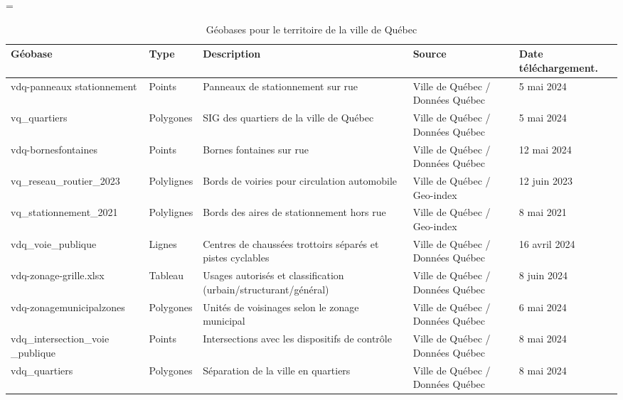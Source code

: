       \begin{landscape}
        \LTcapwidth=\textwidth
      \begin{longtable}[h!]{p{.2 \linewidth} p{.1 \linewidth} p{.3 \linewidth} p{.15\linewidth} p{.125\linewidth} }
        
        
        \hline
        Géobase & Type & Description  & Source & Date téléchargement.\\ 
        \hline
        \hline
        \endhead
        \hline
        \endfoot
        \hline
        \caption{Géobases pour le territoire de la ville de Québec}
        \label{tab:donnees_disponibles_Québec}
        \endlastfoot
        
        
        vdq-panneaux stationnement    & Points        & Panneaux de stationnement sur rue          & Ville de Québec / Données Québec  & 5 mai 2024 \\
        \hline
        vq\_quartiers & Polygones & SIG des quartiers de la ville de Québec & Ville de Québec / Données Québec & 5 mai 2024 \\
        \hline
        vdq-bornesfontaines          & Points        & Bornes fontaines sur rue                   & Ville de Québec / Données Québec & 12 mai 2024 \\
        \hline
        vq\_reseau\_routier\_2023 & Polylignes    & Bords de voiries pour circulation automobile  & Ville de Québec / Geo-index  & 12 juin 2023\\ 
        \hline
        vq\_stationnement\_2021  & Polylignes    & Bords des aires de stationnement hors rue & Ville de Québec / Geo-index & 8 mai 2021\\
        \hline
        vdq\_voie\_publique            & Lignes        & Centres de chaussées trottoirs séparés et pistes cyclables & Ville de Québec / Données Québec & 16 avril 2024 \\
        \hline
        vdq-zonage-grille.xlsx          & Tableau        & Usages autorisés et classification (urbain/structurant/général) & Ville de Québec / Données Québec & 8 juin 2024 \\
        \hline
        vdq-zonagemunicipalzones          & Polygones        & Unités de voisinages selon le zonage municipal & Ville de Québec / Données Québec & 6 mai 2024 \\
        \hline
        vdq\_intersection\_voie \_publique & Points & Intersections avec les dispositifs de contrôle & Ville de Québec / Données Québec & 8 mai 2024 \\
        \hline
        vdq\_quartiers & Polygones &Séparation de la ville en quartiers & Ville de Québec / Données Québec & 8 mai 2024\\

\end{longtable}
\end{landscape}
